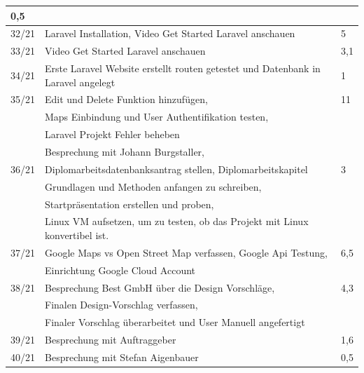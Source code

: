 \begin{table}[h]
\begin{tabular}{|l|lll|}
		0,5 \\ \hline
		32/21 &
		\multicolumn{2}{l|}{Laravel Installation, Video Get Started Laravel anschauen} &
		5 \\ \hline
		33/21 &
		\multicolumn{2}{l|}{Video Get Started Laravel anschauen} &
		3,1 \\ \hline
		34/21 &
		\multicolumn{2}{l|}{Erste Laravel Website erstellt routen getestet und Datenbank in Laravel angelegt} &
		1 \\ \hline
		35/21 &
		\multicolumn{2}{l|}{Edit und Delete Funktion hinzufügen,} &
		11 \\ &Maps Einbindung und User Authentifikation testen,   \\ & Laravel Projekt Fehler beheben\\&Besprechung mit Johann Burgstaller,\\\hline
		36/21 &
		\multicolumn{2}{l|}{Diplomarbeitsdatenbanksantrag stellen, Diplomarbeitskapitel  } &
		3 \\&Grundlagen und Methoden anfangen zu schreiben,\\ 
		&Startpräsentation erstellen und proben,\\ & Linux VM aufsetzen, um zu testen, ob das Projekt mit Linux konvertibel ist.\\\hline
		37/21 &
		\multicolumn{2}{l|}{Google Maps vs Open Street Map verfassen, Google Api Testung,} &
		6,5 \\ & Einrichtung Google Cloud Account\\ \hline
		38/21 &
		\multicolumn{2}{l|}{Besprechung Best GmbH über die Design Vorschläge, } &
		4,3 \\ &Finalen Design-Vorschlag verfassen,\\& Finaler Vorschlag überarbeitet und User Manuell angefertigt\\\hline
		39/21 &
		\multicolumn{2}{l|}{Besprechung mit Auftraggeber} &
		1,6 \\ \hline
		40/21 &
		\multicolumn{2}{l|}{Besprechung mit Stefan Aigenbauer} &
		0,5 \\ \hline
		
	
	\end{tabular}
\end{table}
\newpage
